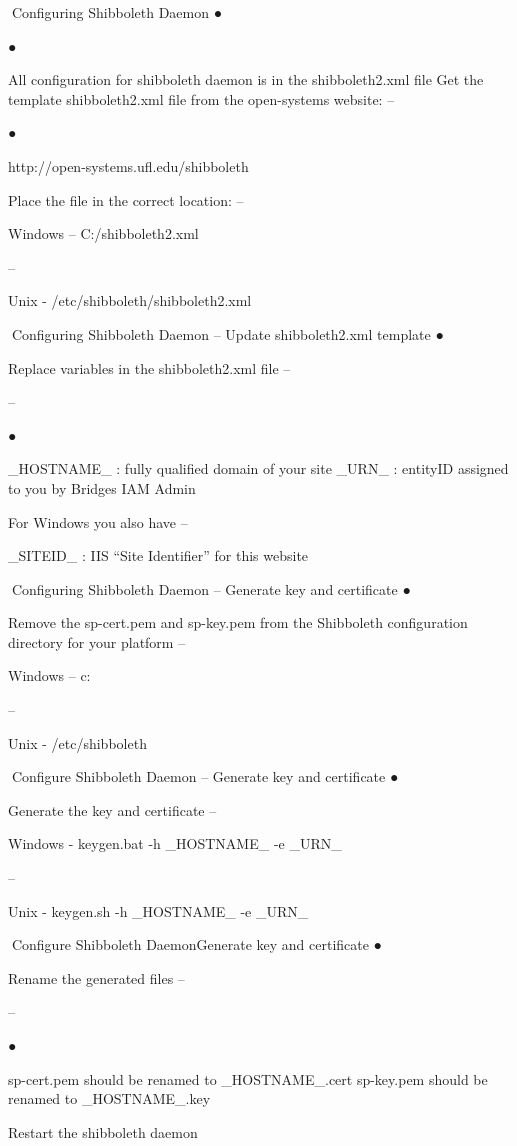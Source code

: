 Configuring Shibboleth Daemon
●

●

All configuration for shibboleth daemon is
in the shibboleth2.xml file
Get the template shibboleth2.xml file from
the open-systems website:
–

●

http://open-systems.ufl.edu/shibboleth

Place the file in the correct location:
–

Windows – C:\opt\shibbolethsp\etc\shibboleth/shibboleth2.xml

–

Unix - /etc/shibboleth/shibboleth2.xml

Configuring Shibboleth Daemon –
Update shibboleth2.xml template
●

Replace variables in the shibboleth2.xml
file
–

–

●

_HOSTNAME_ : fully qualified domain of
your site
_URN_ : entityID assigned to you by
Bridges IAM Admin

For Windows you also have
–

_SITEID_ : IIS “Site Identifier” for this
website

Configuring Shibboleth Daemon –
Generate key and certificate
●

Remove the sp-cert.pem and sp-key.pem
from the Shibboleth configuration
directory for your platform
–

Windows – c:\opt\shibbolethsp\etc\shibboleth

–

Unix - /etc/shibboleth

Configure Shibboleth Daemon –
Generate key and certificate
●

Generate the key and certificate
–

Windows - keygen.bat -h _HOSTNAME_ -e _URN_

–

Unix - keygen.sh -h _HOSTNAME_ -e _URN_

Configure Shibboleth DaemonGenerate key and certificate
●

Rename the generated files
–

–

●

sp-cert.pem should be renamed to
_HOSTNAME_.cert
sp-key.pem should be renamed to
_HOSTNAME_.key

Restart the shibboleth daemon

